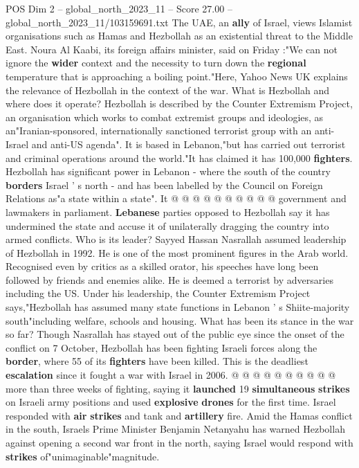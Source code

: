 \begin{textsample}{POS Dim 2 – global\_north\_2023\_11 – Score 27.00 – global\_north\_2023\_11/103159691.txt}  \label{ex:f2_pos_302}
The UAE, an \textbf{ally} of Israel, views Islamist organisations such as Hamas and Hezbollah as an existential threat to the Middle East.
Noura Al Kaabi, its foreign affairs minister, said on Friday :"We can not ignore the \textbf{wider} context and the necessity to turn down the \textbf{regional} temperature that is approaching a boiling point."Here, Yahoo News UK explains the relevance of Hezbollah in the context of the war.
What is Hezbollah and where does it operate?
Hezbollah is described by the Counter Extremism Project, an organisation which works to combat extremist groups and ideologies, as an"Iranian-sponsored, internationally sanctioned terrorist group with an anti-Israel and anti-US agenda".
It is based in Lebanon,"but has carried out terrorist and criminal operations around the world."It has claimed it has 100,000 \textbf{fighters}.
Hezbollah has significant power in Lebanon - where the south of the country \textbf{borders} Israel ' s north - and has been labelled by the Council on Foreign Relations as"a state within a state".
It @ @ @ @ @ @ @ @ @ @ government and lawmakers in parliament. \textbf{Lebanese} parties opposed to Hezbollah say it has undermined the state and accuse it of unilaterally dragging the country into armed conflicts.
Who is its leader?
Sayyed Hassan Nasrallah assumed leadership of Hezbollah in 1992.
He is one of the most prominent figures in the Arab world.
Recognised even by critics as a skilled orator, his speeches have long been followed by friends and enemies alike.
He is deemed a terrorist by adversaries including the US.
Under his leadership, the Counter Extremism Project says,"Hezbollah has assumed many state functions in Lebanon ' s Shiite-majority south"including welfare, schools and housing.
What has been its stance in the war so far?
Though Nasrallah has stayed out of the public eye since the onset of the conflict on 7 October, Hezbollah has been fighting Israeli forces along the \textbf{border}, where 55 of its \textbf{fighters} have been killed.
This is the deadliest \textbf{escalation} since it fought a war with Israel in 2006. @ @ @ @ @ @ @ @ @ @ more than three weeks of fighting, saying it \textbf{launched} 19 \textbf{simultaneous} \textbf{strikes} on Israeli army positions and used \textbf{explosive} \textbf{drones} for the first time.
Israel responded with \textbf{air} \textbf{strikes} and tank and \textbf{artillery} fire.
Amid the Hamas conflict in the south, Israels Prime Minister Benjamin Netanyahu has warned Hezbollah against opening a second war front in the north, saying Israel would respond with \textbf{strikes} of"unimaginable"magnitude.

\end{textsample}
